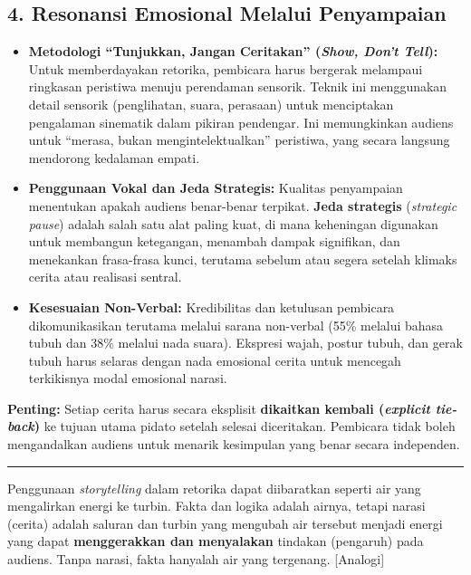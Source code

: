 \documentclass[
  letterpaper,
  DIV=11,
  numbers=noendperiod]{scrreprt}
\providecommand{\tightlist}{%
  \setlength{\itemsep}{0pt}\setlength{\parskip}{0pt}}
\begin{document}
\subsection{4. Resonansi Emosional Melalui
Penyampaian}\label{resonansi-emosional-melalui-penyampaian}

\begin{itemize}
\tightlist
\item
  \textbf{Metodologi ``Tunjukkan, Jangan Ceritakan'' (\emph{Show, Don't
  Tell}):} Untuk memberdayakan retorika, pembicara harus bergerak
  melampaui ringkasan peristiwa menuju perendaman sensorik. Teknik ini
  menggunakan detail sensorik (penglihatan, suara, perasaan) untuk
  menciptakan pengalaman sinematik dalam pikiran pendengar. Ini
  memungkinkan audiens untuk ``merasa, bukan mengintelektualkan''
  peristiwa, yang secara langsung mendorong kedalaman empati.
\item
  \textbf{Penggunaan Vokal dan Jeda Strategis:} Kualitas penyampaian
  menentukan apakah audiens benar-benar terpikat. \textbf{Jeda
  strategis} (\emph{strategic pause}) adalah salah satu alat paling
  kuat, di mana keheningan digunakan untuk membangun ketegangan,
  menambah dampak signifikan, dan menekankan frasa-frasa kunci, terutama
  sebelum atau segera setelah klimaks cerita atau realisasi sentral.
\item
  \textbf{Kesesuaian Non-Verbal:} Kredibilitas dan ketulusan pembicara
  dikomunikasikan terutama melalui sarana non-verbal (55\% melalui
  bahasa tubuh dan 38\% melalui nada suara). Ekspresi wajah, postur
  tubuh, dan gerak tubuh harus selaras dengan nada emosional cerita
  untuk mencegah terkikisnya modal emosional narasi.
\end{itemize}

\textbf{Penting:} Setiap cerita harus secara eksplisit \textbf{dikaitkan
kembali (\emph{explicit tie-back})} ke tujuan utama pidato setelah
selesai diceritakan. Pembicara tidak boleh mengandalkan audiens untuk
menarik kesimpulan yang benar secara independen.

\begin{center}\rule{0.5\linewidth}{0.5pt}\end{center}

Penggunaan \emph{storytelling} dalam retorika dapat diibaratkan seperti
air yang mengalirkan energi ke turbin. Fakta dan logika adalah airnya,
tetapi narasi (cerita) adalah saluran dan turbin yang mengubah air
tersebut menjadi energi yang dapat \textbf{menggerakkan dan menyalakan}
tindakan (pengaruh) pada audiens. Tanpa narasi, fakta hanyalah air yang
tergenang. {[}Analogi{]}
\end{document}
